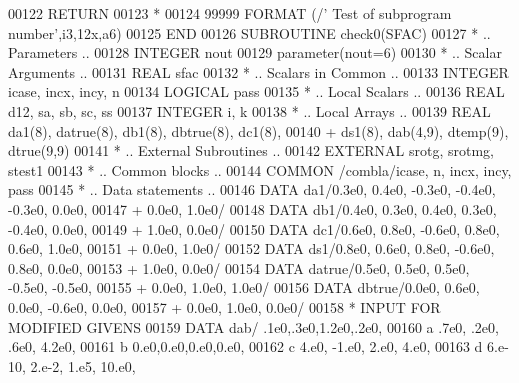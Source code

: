 \begin{DoxyCode}
00122       \textcolor{keywordflow}{RETURN}
00123 \textcolor{comment}{*}
00124 99999 \textcolor{keyword}{FORMAT} (/\textcolor{stringliteral}{' Test of subprogram number'},i3,12x,a6)
00125 \textcolor{keyword}{      END}
00126 \textcolor{keyword}{      SUBROUTINE }check0(SFAC)
00127 \textcolor{comment}{*     .. Parameters ..}
00128       \textcolor{keywordtype}{INTEGER}           nout
00129       parameter(nout=6)
00130 \textcolor{comment}{*     .. Scalar Arguments ..}
00131       \textcolor{keywordtype}{REAL}              sfac
00132 \textcolor{comment}{*     .. Scalars in Common ..}
00133       \textcolor{keywordtype}{INTEGER}           icase, incx, incy, n
00134       \textcolor{keywordtype}{LOGICAL}           pass
00135 \textcolor{comment}{*     .. Local Scalars ..}
00136       \textcolor{keywordtype}{REAL}              d12, sa, sb, sc, ss
00137       \textcolor{keywordtype}{INTEGER}           i, k
00138 \textcolor{comment}{*     .. Local Arrays ..}
00139       \textcolor{keywordtype}{REAL}              da1(8), datrue(8), db1(8), dbtrue(8), dc1(8),
00140      +                  ds1(8), dab(4,9), dtemp(9), dtrue(9,9)
00141 \textcolor{comment}{*     .. External Subroutines ..}
00142       \textcolor{keywordtype}{EXTERNAL}          srotg, srotmg, stest1
00143 \textcolor{comment}{*     .. Common blocks ..}
00144       \textcolor{keyword}{COMMON}            /combla/icase, n, incx, incy, pass
00145 \textcolor{comment}{*     .. Data statements ..}
00146       \textcolor{keyword}{DATA}              da1/0.3e0, 0.4e0, -0.3e0, -0.4e0, -0.3e0, 0.0e0,
00147      +                  0.0e0, 1.0e0/
00148       \textcolor{keyword}{DATA}              db1/0.4e0, 0.3e0, 0.4e0, 0.3e0, -0.4e0, 0.0e0,
00149      +                  1.0e0, 0.0e0/
00150       \textcolor{keyword}{DATA}              dc1/0.6e0, 0.8e0, -0.6e0, 0.8e0, 0.6e0, 1.0e0,
00151      +                  0.0e0, 1.0e0/
00152       \textcolor{keyword}{DATA}              ds1/0.8e0, 0.6e0, 0.8e0, -0.6e0, 0.8e0, 0.0e0,
00153      +                  1.0e0, 0.0e0/
00154       \textcolor{keyword}{DATA}              datrue/0.5e0, 0.5e0, 0.5e0, -0.5e0, -0.5e0,
00155      +                  0.0e0, 1.0e0, 1.0e0/
00156       \textcolor{keyword}{DATA}              dbtrue/0.0e0, 0.6e0, 0.0e0, -0.6e0, 0.0e0,
00157      +                  0.0e0, 1.0e0, 0.0e0/
00158 \textcolor{comment}{*     INPUT FOR MODIFIED GIVENS}
00159       \textcolor{keyword}{DATA} dab/ .1e0,.3e0,1.2e0,.2e0,
00160      a          .7e0, .2e0, .6e0, 4.2e0,
00161      b          0.e0,0.e0,0.e0,0.e0,
00162      c          4.e0, -1.e0, 2.e0, 4.e0,
00163      d          6.e-10, 2.e-2, 1.e5, 10.e0,

\end{DoxyCode}
